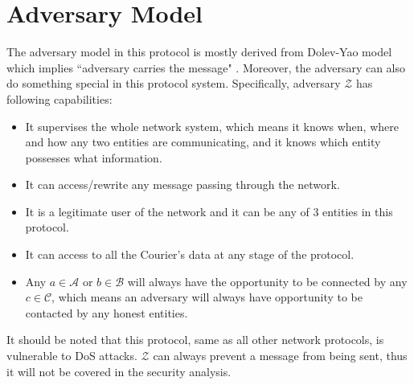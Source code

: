\section{Adversary Model}
The adversary model in this protocol is mostly derived from Dolev-Yao model which implies ``adversary carries the message" \cite{dolev}. Moreover, the adversary can also do something special in this protocol system. Specifically, adversary $\mathcal{Z}$ has following capabilities:
\begin{itemize}
\item It supervises the whole network system, which means it knows when, where and how any two entities are communicating, and it knows which entity possesses what information.
\item It can access/rewrite any message passing through the network.
\item It is a legitimate user of the network and it can be any of 3 entities in this protocol.
\item It can access to all the Courier's data at any stage of the protocol.
\item Any $a \in \mathcal{A}$ or $b \in \mathcal{B}$ will always have the opportunity to be connected by any $c \in \mathcal{C}$, which means an adversary will always have opportunity to be contacted by any honest entities.
\end{itemize}

It should be noted that this protocol, same as all other network protocols, is vulnerable to DoS attacks. $\mathcal{Z}$ can always prevent a message from being sent, thus it will not be covered in the security analysis.